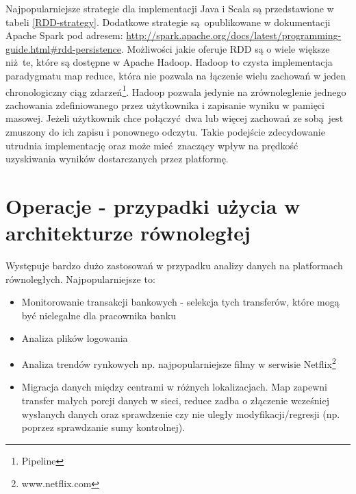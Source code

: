 Najpopularniejsze strategie dla implementacji Java i Scala są przedstawione w tabeli \ref{RDD-strategy}. Dodatkowe strategie są opublikowane w dokumentacji Apache Spark pod adresem: \url{http://spark.apache.org/docs/latest/programming-guide.html#rdd-persistence}. Możliwości jakie oferuje RDD są o wiele większe niż te, które są dostępne w Apache Hadoop. Hadoop to czysta implementacja paradygmatu map reduce, która nie pozwala na łączenie wielu zachowań w jeden chronologiczny ciąg zdarzeń\footnote{Pipeline}. Hadoop pozwala jedynie na zrównoleglenie jednego zachowania zdefiniowanego przez użytkownika i zapisanie wyniku w pamięci masowej. Jeżeli użytkownik chce połączyć dwa lub więcej zachowań ze sobą jest zmuszony do ich zapisu i ponownego odczytu. Takie podejście zdecydowanie utrudnia implementację oraz może mieć znaczący wpływ na prędkość uzyskiwania wyników dostarczanych przez platformę. 

\section{Operacje - przypadki użycia w architekturze równoległej}
Występuje bardzo dużo zastosowań w przypadku analizy danych na platformach równoległych. Najpopularniejsze to:
\begin{itemize}
	\item Monitorowanie transakcji bankowych - selekcja tych transferów, które mogą być nielegalne dla pracownika banku
	\item Analiza plików logowania
	\item Analiza trendów rynkowych np. najpopularniejsze filmy w serwisie Netflix\footnote{www.netflix.com}
	\item Migracja danych między centrami w różnych lokalizacjach. Map zapewni transfer małych porcji danych w sieci, reduce zadba o złączenie wcześniej wysłanych danych oraz sprawdzenie czy nie uległy modyfikacji/regresji (np. poprzez sprawdzanie sumy kontrolnej). 
\end{itemize}